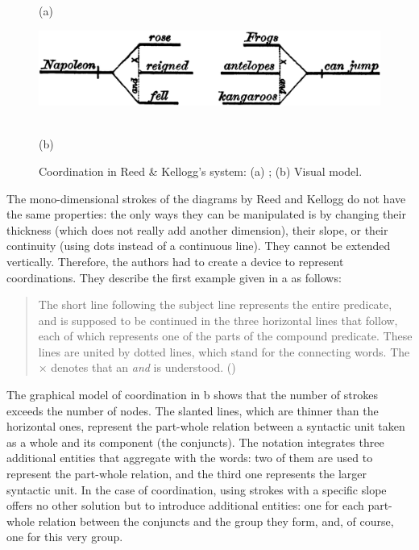 \documentclass[english,output=paper,colorlinks,citecolor=brown]{../langscibook}
\begin{document}
\begin{figure}
    (a) \hspace{1em} \begin{minipage}[c]{.75\textwidth}\includegraphics[width=\textwidth]{figures/04/ReedKellog3.png}\end{minipage}\bigskip\\
    (b) \hspace{1em} 
    \caption{Coordination in Reed \& Kellogg’s system: (a) \citeyear[47]{ReedBrainerd1879}; (b) Visual model.\label{fig:4:8}}    
\end{figure}


The mono-dimensional strokes of the diagrams by Reed and Kellogg do not have the same properties: the only ways they can be manipulated is by changing their thickness (which does not really add another dimension), their slope, or their continuity (using dots instead of a continuous line). They cannot be extended vertically. Therefore, the authors had to create a device to represent coordinations. They describe the first example given in a as follows:

\begin{quote}
The short line following the subject line represents the entire predicate, and is supposed to be continued in the three horizontal lines that follow, each of which represents one of the parts of the compound predicate. These lines are united by dotted lines, which stand for the connecting words. The × denotes that an \textit{and} is understood. (\citealt[47--48]{ReedBrainerd1879})
\end{quote}

The graphical model of coordination in b shows that the number of strokes exceeds the number of nodes. The slanted lines, which are thinner than the horizontal ones, represent the part-whole relation between a syntactic unit taken as a whole and its component (the conjuncts). The notation integrates three additional entities that aggregate with the words: two of them are used to represent the part-whole relation, and the third one represents the larger syntactic unit. In the case of coordination, using strokes with a specific slope offers no other solution but to introduce additional entities: one for each part-whole relation between the conjuncts and the group they form, and, of course, one for this very group.
\end{document}
